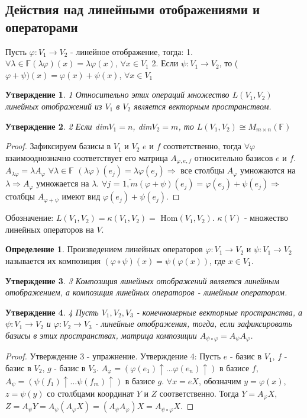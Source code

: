 \documentclass[a4paper, 12pt]{article}
\newcommand{\F}{\mathbb F}
\renewcommand{\phi}{\varphi}
\theoremstyle{definition}
\newtheorem*{definition}{Определение}
\theoremstyle{plain}
\newtheorem*{subtheorem}{Утверждение}
\theoremstyle{remark}
\begin{document}
  \subsection{Действия над линейными отображениями и операторами}
  Пусть $\phi: V_1 \to V_2$ - линейное отображение, тогда:
  1. $\forall \lambda \in \F (\lambda\phi)(x) = \lambda\phi(x)$, $\forall x \in V_1$
  2. Если $\psi: V_1 \to V_2$, то ($\phi+\psi)(x) = \phi(x)+\psi(x)$, $\forall x \in V_1$
  \begin{subtheorem} 1
    Относительно этих операций множество $L(V_1, V_2)$ линейных отображений из $V_1$ в $V_2$ является векторным пространством.
  \end{subtheorem}
  \begin{subtheorem} 2
    Если dim$V_1 = n$, dim$V_2 = m$, то $L(V_1, V_2) \cong M_{m \times n}(\F)$
  \end{subtheorem}
  \begin{proof}
    Зафиксируем базисы в $V_1$ и $V_2$ $e$ и $f$ соответственно, тогда $\forall \phi$ взаимооднозначно соответствует его матрица $A_{\phi, e, f}$ относительно базисов $e$ и $f$.
    $A_{\lambda \phi} = \lambda A_{\phi}$  $\forall \lambda \in \F$
    $(\lambda \phi)(e_j) = \lambda \phi(e_j) \Longrightarrow$ все столбцы $A_{\phi}$ умножаются на $\lambda \Longrightarrow A_{\phi}$ умножается на $\lambda$.
    $\forall j$ = $\bar{1, m} (\phi + \psi)(e_j) = \phi(e_j) + \psi(e_j) \Longrightarrow$ столбцы $A_{\phi + \psi}$ имеют вид $\phi(e_j) + \psi(e_j)$.
  \end{proof}
  Обозначение: $L(V_1, V_2) = \kappa(V_1, V_2) =$ Hom$(V_1, V_2)$.
  $\kappa(V)$ - множество линейных операторов на $V$.
  \begin{definition}
    Произведением линейных операторов $\phi: V_1 \to V_2$ и $\psi: V_1 \to V_2$ называется их композиция $(\phi\circ\psi)(x) = \psi(\phi(x))$, где $x \in V_1$.
  \end{definition}
  \begin{subtheorem} 3
    Композиция линейных отображений является линейным отображением, а композиция линейных операторов - линейным оператором.
  \end{subtheorem}
  \begin{subtheorem} 4
    Пусть $V_1, V_2, V_3$ - конечномерные векторные пространства, а $\psi: V_1 \to V_2$ и $\phi: V_2 \to V_3$ - линейные отображения, тогда, если зафиксировать базисы в этих пространствах, матрица композиции $A_{\psi\circ\phi} = A_{\psi} A_{\phi}$.
  \end{subtheorem}
  \begin{proof}
    Утверждение 3 - упражнение.
    Утверждение 4:
    Пусть $e$ - базис в $V_1$, $f$ - базис в $V_2$, $g$ - базис в $V_3$.
    $A_{\phi} = (\phi(e_1)\uparrow \ldots \phi(e_n)\uparrow)$ в базисе $f$, $A_{\psi} = (\psi(f_1)\uparrow \dots \psi(f_m)\uparrow)$ в базисе $g$.    $\forall x = e X$, обозначим $y = \phi(x)$, $z = \psi(y)$ со столбцами координат $Y$ и $Z$ соответственно.
    Тогда $Y = A_{\phi}X$, $Z = A_{\psi}Y = A_{\psi}(A_{\phi}X) = (A_{\psi}A_{\phi})X = A_{\psi\circ\phi}X$.
  \end{proof}
\end{document}
